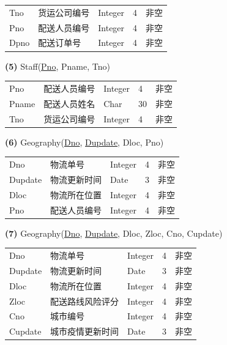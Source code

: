 \documentclass[12pt]{article}
\begin{document}
\begin{center}
	\begin{tabular}{lllll}
		\toprule
		Tno &	货运公司编号 &	Integer &	4 &	非空 \\
		Pno &	配送人员编号 &	Integer &	4 &	非空 \\
		Dpno &	配送订单号 &	Integer &	4 &	非空 \\
		\bottomrule
	\end{tabular}
\end{center}

\vspace{0.5cm}
\noindent \textbf{(5)} Staff(\uline{Pno}, Pname, Tno)

\begin{center}
	\begin{tabular}{lllll}
		\toprule
		Pno &	配送人员编号 &	Integer &	4 &	非空 \\
		Pname &	配送人员姓名 &	Char &	30 &	非空 \\
		Tno &	货运公司编号 &	Integer &	4 &	非空 \\
		\bottomrule
	\end{tabular}
\end{center}

\vspace{0.5cm}
\noindent \textbf{(6)} Geography(\uline{Dno}, \uline{Dupdate}, Dloc, Pno)

\begin{center}
	\begin{tabular}{lllll}
		\toprule
		Dno &	物流单号 &	Integer &	4 &	非空 \\
		Dupdate &	物流更新时间 &	Date &	3 &	非空 \\
		Dloc &	物流所在位置 &	Integer &	4 &	非空 \\
		Pno &	配送人员编号 &	Integer &	4 &	非空 \\
		\bottomrule
	\end{tabular}
\end{center}

\vspace{0.5cm}
\noindent \textbf{(7)} Geography(\uline{Dno}, \uline{Dupdate}, Dloc, Zloc, Cno, Cupdate)

\begin{center}
	\begin{tabular}{lllll}
		\toprule
		Dno &	物流单号 &	Integer &	4 &	非空 \\
		Dupdate &	物流更新时间 &	Date &	3 &	非空 \\
		Dloc &	物流所在位置 &	Integer &	4 &	非空 \\
		Zloc &	配送路线风险评分 &	Integer &	4 &	非空 \\
		Cno &	城市编号 &	Integer &	4 &	非空 \\
		Cupdate &	城市疫情更新时间 &	Date &	3 &	非空 \\
		\bottomrule
	\end{tabular}
\end{center}
\end{document}
